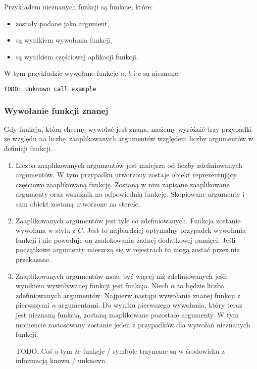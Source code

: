 \documentclass[declaration,shortabstract]{iithesis}
\begin{document}
Przykładem nieznanych funkcji są funkcje, które: 
\begin{itemize}
  \item zostały podane jako argument,
  \item są wynikiem wywołania funkcji,
  \item są wynikiem częściowej aplikacji funkcji.
\end{itemize}

W tym przykładzie wywołane funkcje $a$, $b$ i $c$ są nieznane.

\begin{lstlisting}[frame=single, caption=Przykłady statycznie 
nieznanej funkcji.]
TODO: Unknown call example
\end{lstlisting}

\subsubsection{Wywołanie funkcji znanej}

Gdy funkcja, którą chcemy wywołać jest znana, możemy wyróżnić trzy przypadki 
ze względu na liczbę zaaplikowanych argumentów względem liczby argumentów
w definicji funkcji.

\begin{enumerate}
  \item Liczba zaaplikowanych argumentów jest mniejsza od liczby zdefiniowanych 
  argumentów. W tym przypadku utworzony zostaje obiekt reprezentujący częściowo
  zaaplikowaną funkcję. Zostaną w nim zapisane zaaplikowane argumenty oraz 
  wskaźnik na odpowiednią funkcję. Skopiowane argumenty i sam obiekt zostaną 
  utworzone na stercie.
  \item Zaaplikowanych argumentów jest tyle co zdefiniowanych. Funkcja zostanie
  wywołana w stylu z $C$. Jest to najbardziej optymalny przypadek wywołania 
  funkcji i nie powoduje on zaalokowania żadnej dodatkowej pamięci. Jeśli 
  początkowe argumenty mieszczą się w rejestrach to mogą zostać przez nie 
  przekazane.
  \item Zaaplikowanych argumentów może być więcej niż zdefiniowanych jeśli wynikiem wywoływanej funkcji jest funkcja. Niech $n$ to będzie liczba 
  zdefiniowanych argumentów. Najpierw nastąpi wywołanie znanej funkcji z 
  pierwszymi $n$ argumentami. Do wyniku pierwszego wywołania, który teraz jest
  nieznaną funkcją, zostaną zaaplikowane pozostałe argumenty. W tym momencie 
  zastosowany zostanie jeden z przypadków dla wywołań nieznanych funkcji.

TODO: Coś o tym że funkcje / symbole trzymane są w środowisku z informacją 
known / unknown.
\end{enumerate}
\end{document}
